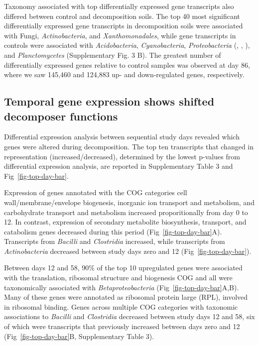 \documentclass[
  sn-nature,
  lineno, referee]{sn-jnl}
\begin{document}
Taxonomy associated with top differentially expressed gene transcripts
also differed between control and decomposition soils. The top 40 most
significant differentially expressed gene transcripts in decomposition
soils were associated with Fungi, \emph{Actinobacteria}, and
\emph{Xanthomonadales}, while gene transcripts in controls were
associated with \emph{Acidobacteria}, \emph{Cyanobacteria},
\emph{Proteobacteria} (\textalpha, \textdelta, \textgamma), and
\emph{Planctomycetes} (Supplementary Fig. 3 B). The greatest number of
differentially expressed genes relative to control samples was observed
at day 86, where we saw 145,460 and 124,883 up- and down-regulated
genes, respectively.

\subsection{Temporal gene expression shows shifted decomposer
functions}\label{temporal-gene-expression-shows-shifted-decomposer-functions}

Differential expression analysis between sequential study days revealed
which genes were altered during decomposition. The top ten transcripts
that changed in representation (increased/decreased), determined by the
lowest p-values from differential expression analysis, are reported in
Supplementary Table 3 and Fig~\ref{fig-top-day-bar}.

Expression of genes annotated with the COG categories cell
wall/membrane/envelope biogenesis, inorganic ion transport and
metabolism, and carbohydrate transport and metabolism increased
proporitionally from day 0 to 12. In contrast, expression of secondary
metabolite biosynthesis, transport, and catabolism genes decreased
during this period (Fig~\ref{fig-top-day-bar}A). Transcripts from
\emph{Bacilli} and \emph{Clostridia} increased, while transcripts from
\emph{Actinobacteria} decreased between study days zero and 12
(Fig~\ref{fig-top-day-bar}).

Between days 12 and 58, 90\% of the top 10 upregulated genes were
associated with the translation, ribosomal structure and biogenesis COG
and all were taxonomically associated with \emph{Betaproteobacteria}
(Fig~\ref{fig-top-day-bar}A,B). Many of these genes were annotated as
ribosomal protein large (RPL), involved in ribosomal binding. Genes
across multiple COG categories with taxonomic associations to
\emph{Bacilli} and \emph{Clostridia} decreased between study days 12 and
58, six of which were transcripts that previously increased between days
zero and 12 (Fig~\ref{fig-top-day-bar}B, Supplementary Table 3).
\end{document}
